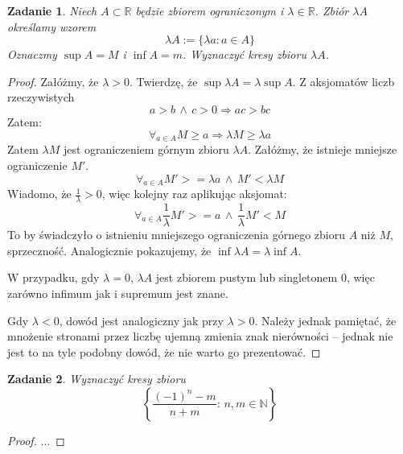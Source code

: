\documentclass{article}
\newtheorem{problem}{Zadanie}
\begin{document}
\begin{problem}
    Niech $A \subset \mathbb{R}$ będzie zbiorem ograniczonym i
    $\lambda \in \mathbb{R}$. Zbiór $\lambda A$ określamy wzorem
    $$ \lambda A := \{ \lambda a : a \in A \} $$
    Oznaczmy $\sup A = M$ i $\inf A = m$. Wyznaczyć kresy zbioru
    $\lambda A$.
\end{problem}
\begin{proof}
    Załóżmy, że $\lambda > 0$.
    Twierdzę, że $\sup \lambda A = \lambda \sup A$.
    Z aksjomatów liczb rzeczywistych
    $$ a > b \,\wedge\, c > 0 \Rightarrow ac > bc $$
    Zatem:
    $$ \forall_{a \in A} M \geq a \Rightarrow \lambda M \geq \lambda a$$
    Zatem $\lambda M$ jest ograniczeniem górnym zbioru $\lambda A$.
    Załóżmy, że istnieje mniejsze ograniczenie $M'$.
    $$ \forall_{a \in A} M' >= \lambda a \,\wedge\, M' < \lambda M $$
    Wiadomo, że $\frac{1}{\lambda} > 0$, więc kolejny raz aplikując aksjomat:
    $$ \forall_{a \in A} \frac{1}{\lambda}M' >= a \,\wedge\, \frac{1}{\lambda}M' < M $$
    To by świadczyło o istnieniu mniejszego ograniczenia górnego zbioru $A$ niż
    $M$, sprzeczność. Analogicznie pokazujemy, że $\inf \lambda A = \lambda \inf A$.

    W przypadku, gdy $\lambda = 0$, $\lambda A $ jest zbiorem pustym lub
    singletonem $0$, więc zarówno infimum jak i supremum jest znane.

    Gdy $\lambda < 0$, dowód jest analogiczny jak przy $\lambda > 0$.
    Należy jednak pamiętać, że mnożenie stronami przez liczbę ujemną
    zmienia znak nierówności -- jednak nie jest to na tyle podobny dowód, że
    nie warto go prezentować.
\end{proof}

\begin {problem}
Wyznaczyć kresy zbioru
$$ \left\{ \frac{(-1)^n - m}{n + m} : \, n,m \in \mathbb{N} \right\} $$
\end{problem}
\begin{proof}
$\ldots$
\end{proof}
\end{document}

